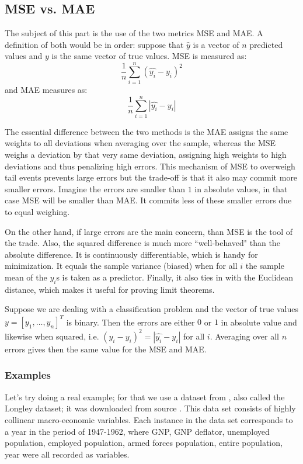 \documentclass{llncs}
\begin{document}
\subsection{MSE vs. MAE}
The subject of this part is the use of the two metrics MSE and MAE. A definition of both would be in order: suppose that $\hat{y}$ is a vector of $n$ predicted values and $y$ is the same vector of true values. MSE is measured as:
$$
\frac{1}{n}\sum_{i=1}^{n}(\hat{y_{i}} - y_{i})^{2}
$$  
and MAE measures as:
$$
\frac{1}{n}\sum_{i=1}^{n}|\hat{y_{i}}-y_{i}|
$$

\noindent The essential difference between the two methods is the MAE assigns the same weights to all deviations when averaging over the sample, whereas the MSE weighs a deviation by that very same deviation, assigning high weights to high deviations and thus penalizing high errors. This mechanism of MSE to overweigh tail events prevents large errors but the trade-off is that it also may commit more smaller errors. Imagine the errors are smaller than $1$ in absolute values, in that case MSE will be smaller than MAE. It commits less of these smaller errors due to equal weighing.

On the other hand, if large errors are the main concern, than MSE is the tool of the trade. Also, the squared difference is much more ``well-behaved" than the absolute difference. It is continuously differentiable, which is handy for minimization. It equals the sample variance (biased) when for all $i$ the sample mean of the $y_{i}$s is taken as a predictor. Finally, it also ties in with the Euclidean distance, which makes it useful for proving limit theorems.

Suppose we are dealing with a classification problem and the vector of true values $y=[y_{1},\dots,y_{n}]^{T}$ is binary. Then the errors are either $0$ or $1$ in absolute value and likewise when squared, i.e. $(\hat{y_{i}} - y_{i})^{2}=|\hat{y_{i}}-y_{i}|$ for all $i$. Averaging over all $n$ errors gives then the same value for the MSE and MAE.

\subsubsection{Examples}
Let's try doing a real example; for that we use a dataset from \cite{Longl}, also called the Longley dataset; it was downloaded from source \cite{WinNT}. This data set consists of highly collinear macro-economic variables. Each instance in the data set corresponds to a year in the period of 1947-1962, where GNP, GNP deflator, unemployed population, employed population, armed forces population, entire population, year were all recorded as variables.
\end{document}
